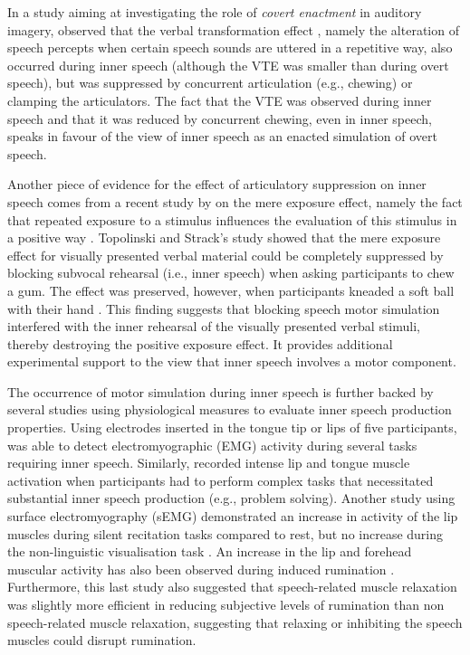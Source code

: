 \documentclass[12pt,]{book}
\begin{document}
In a study aiming at investigating the role of \emph{covert enactment}
in auditory imagery, \citet{Reisberg1989} observed that the verbal
transformation effect \citep[VTE,][]{Warren1958}, namely the alteration
of speech percepts when certain speech sounds are uttered in a
repetitive way, also occurred during inner speech (although the VTE was
smaller than during overt speech), but was suppressed by concurrent
articulation (e.g., chewing) or clamping the articulators. The fact that
the VTE was observed during inner speech and that it was reduced by
concurrent chewing, even in inner speech, speaks in favour of the view
of inner speech as an enacted simulation of overt speech.

Another piece of evidence for the effect of articulatory suppression on
inner speech comes from a recent study by \citet{Topolinski2009} on the
mere exposure effect, namely the fact that repeated exposure to a
stimulus influences the evaluation of this stimulus in a positive way
\citep{Zajonc1968}. Topolinski and Strack's study showed that the mere
exposure effect for visually presented verbal material could be
completely suppressed by blocking subvocal rehearsal (i.e., inner
speech) when asking participants to chew a gum. The effect was
preserved, however, when participants kneaded a soft ball with their
hand \citep{Topolinski2009}. This finding suggests that blocking speech
motor simulation interfered with the inner rehearsal of the visually
presented verbal stimuli, thereby destroying the positive exposure
effect. It provides additional experimental support to the view that
inner speech involves a motor component.

The occurrence of motor simulation during inner speech is further backed
by several studies using physiological measures to evaluate inner speech
production properties. Using electrodes inserted in the tongue tip or
lips of five participants, \citet{Jacobson1931} was able to detect
electromyographic (EMG) activity during several tasks requiring inner
speech. Similarly, \citet{Sokolov1972} recorded intense lip and tongue
muscle activation when participants had to perform complex tasks that
necessitated substantial inner speech production (e.g., problem
solving). Another study using surface electromyography (sEMG)
demonstrated an increase in activity of the lip muscles during silent
recitation tasks compared to rest, but no increase during the
non-linguistic visualisation task \citep{Livesay1996}. An increase in
the lip and forehead muscular activity has also been observed during
induced rumination \citep{Nalborczyk2017}. Furthermore, this last study
also suggested that speech-related muscle relaxation was slightly more
efficient in reducing subjective levels of rumination than non
speech-related muscle relaxation, suggesting that relaxing or inhibiting
the speech muscles could disrupt rumination.
\end{document}
